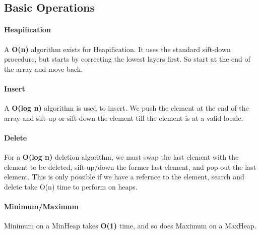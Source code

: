 \subsection{Basic Operations}

\paragraph{Heapification}
A \textbf{O(n)} algorithm exists for Heapification. It uses the standard sift-down procedure, but starts by correcting the lowest layers first. So start at the end of the array and move back.

\paragraph{Insert}
A \textbf{O(log n)} algorithm is used to insert. We push the element at the end of the array and sift-up or sift-down the element till the element is at a valid locale.

\paragraph{Delete}
For a \textbf{O(log n)} deletion algorithm, we must swap the last element with the element to be deleted, sift-up/down the former last element, and pop-out the last element.
This is only possible if we have a refernce to the element, search and delete take O(n) time to perform on heaps.

\paragraph{Minimum/Maximum}
Minimum on a MinHeap takes \textbf{O(1)} time, and so does Maximum on a MaxHeap.
